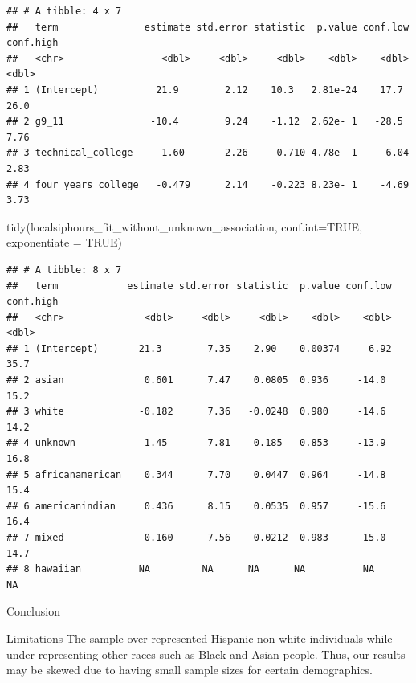 \documentclass[
  11 pt,
]{article}
\newenvironment{Shaded}{\begin{snugshade}}{\end{snugshade}}
\newcommand{\AttributeTok}[1]{\textcolor[rgb]{0.77,0.63,0.00}{#1}}
\newcommand{\ConstantTok}[1]{\textcolor[rgb]{0.00,0.00,0.00}{#1}}
\newcommand{\FunctionTok}[1]{\textcolor[rgb]{0.00,0.00,0.00}{#1}}
\newcommand{\NormalTok}[1]{#1}
\begin{document}
\begin{verbatim}
## # A tibble: 4 x 7
##   term               estimate std.error statistic  p.value conf.low conf.high
##   <chr>                 <dbl>     <dbl>     <dbl>    <dbl>    <dbl>     <dbl>
## 1 (Intercept)          21.9        2.12    10.3   2.81e-24    17.7      26.0 
## 2 g9_11               -10.4        9.24    -1.12  2.62e- 1   -28.5       7.76
## 3 technical_college    -1.60       2.26    -0.710 4.78e- 1    -6.04      2.83
## 4 four_years_college   -0.479      2.14    -0.223 8.23e- 1    -4.69      3.73
\end{verbatim}

\begin{Shaded}
\begin{Highlighting}[]
\FunctionTok{tidy}\NormalTok{(localsiphours\_fit\_without\_unknown\_association, }\AttributeTok{conf.int=}\ConstantTok{TRUE}\NormalTok{, }\AttributeTok{exponentiate =} \ConstantTok{TRUE}\NormalTok{)}
\end{Highlighting}
\end{Shaded}

\begin{verbatim}
## # A tibble: 8 x 7
##   term            estimate std.error statistic  p.value conf.low conf.high
##   <chr>              <dbl>     <dbl>     <dbl>    <dbl>    <dbl>     <dbl>
## 1 (Intercept)       21.3        7.35    2.90    0.00374     6.92      35.7
## 2 asian              0.601      7.47    0.0805  0.936     -14.0       15.2
## 3 white             -0.182      7.36   -0.0248  0.980     -14.6       14.2
## 4 unknown            1.45       7.81    0.185   0.853     -13.9       16.8
## 5 africanamerican    0.344      7.70    0.0447  0.964     -14.8       15.4
## 6 americanindian     0.436      8.15    0.0535  0.957     -15.6       16.4
## 7 mixed             -0.160      7.56   -0.0212  0.983     -15.0       14.7
## 8 hawaiian          NA         NA      NA      NA          NA         NA
\end{verbatim}

Conclusion

Limitations The sample over-represented Hispanic non-white individuals
while under-representing other races such as Black and Asian people.
Thus, our results may be skewed due to having small sample sizes for
certain demographics.
\end{document}
